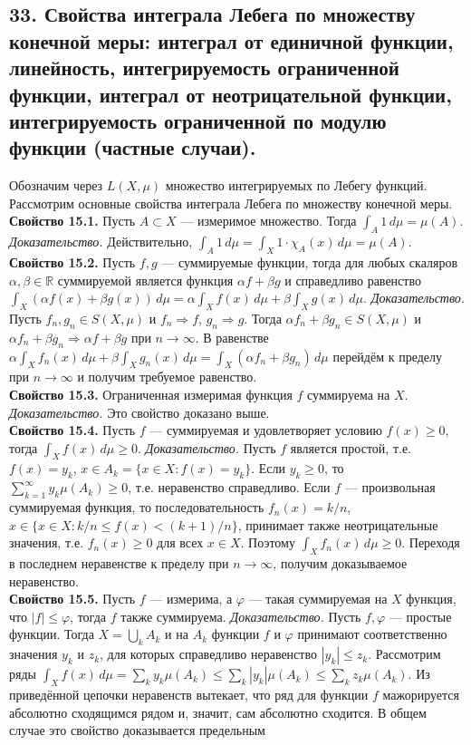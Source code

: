\documentclass[12pt]{article}
\begin{document}
\subsection*{33. Свойства интеграла Лебега по множеству конечной меры: интеграл от единичной
функции, линейность, интегрируемость ограниченной функции, интеграл от
неотрицательной функции, интегрируемость ограниченной по модулю функции
(частные случаи).}
Обозначим через $L(X,\mu)$ множество интегрируемых по Лебегу функций. Рассмотрим основные свойства интеграла Лебега по множеству конечной меры. \\\textbf{Свойство 15.1.} Пусть $A\subset X$ — измеримое множество. Тогда $\int_A 1\,d\mu=\mu(A)$. \textit{Доказательство.} Действительно, $\int_A 1\,d\mu=\int_X 1\cdot\chi_A(x)\,d\mu=\mu(A)$. \\\textbf{Свойство 15.2.} Пусть $f,g$ — суммируемые функции, тогда для любых скаляров $\alpha,\beta\in\mathbb{R}$ суммируемой является функция $\alpha f+\beta g$ и справедливо равенство $\int_X(\alpha f(x)+\beta g(x))\,d\mu=\alpha\int_X f(x)\,d\mu+\beta\int_X g(x)\,d\mu$. \textit{Доказательство.} Пусть $f_n,g_n\in S(X,\mu)$ и $f_n\Rightarrow f$, $g_n\Rightarrow g$. Тогда $\alpha f_n+\beta g_n\in S(X,\mu)$ и $\alpha f_n+\beta g_n\Rightarrow \alpha f+\beta g$ при $n\to\infty$. В равенстве $\alpha\int_X f_n(x)\,d\mu+\beta\int_X g_n(x)\,d\mu=\int_X(\alpha f_n+\beta g_n)\,d\mu$ перейдём к пределу при $n\to\infty$ и получим требуемое равенство. \\\textbf{Свойство 15.3.} Ограниченная измеримая функция $f$ суммируема на $X$. \textit{Доказательство.} Это свойство доказано выше. \\\textbf{Свойство 15.4.} Пусть $f$ — суммируемая и удовлетворяет условию $f(x)\geq 0$, тогда $\int_X f(x)\,d\mu\geq 0$. \textit{Доказательство.} Пусть $f$ является простой, т.е. $f(x)=y_k$, $x\in A_k=\{x\in X:f(x)=y_k\}$. Если $y_k\geq 0$, то $\sum_{k=1}^\infty y_k\mu(A_k)\geq 0$, т.е. неравенство справедливо. Если $f$ — произвольная суммируемая функция, то последовательность $f_n(x)=k/n$, $x\in\{x\in X:k/n\leq f(x)<(k+1)/n\}$, принимает также неотрицательные значения, т.е. $f_n(x)\geq 0$ для всех $x\in X$. Поэтому $\int_X f_n(x)\,d\mu\geq 0$. Переходя в последнем неравенстве к пределу при $n\to\infty$, получим доказываемое неравенство. \\\textbf{Свойство 15.5.} Пусть $f$ — измерима, а $\varphi$ — такая суммируемая на $X$ функция, что $|f|\leq \varphi$, тогда $f$ также суммируема. \textit{Доказательство.} Пусть $f,\varphi$ — простые функции. Тогда $X=\bigcup_k A_k$ и на $A_k$ функции $f$ и $\varphi$ принимают соответственно значения $y_k$ и $z_k$, для которых справедливо неравенство $|y_k|\leq z_k$. Рассмотрим ряды $\int_X f(x)\,d\mu=\sum_k y_k\mu(A_k)\leq\sum_k |y_k|\mu(A_k)\leq\sum_k z_k\mu(A_k)$. Из приведённой цепочки неравенств вытекает, что ряд для функции $f$ мажорируется абсолютно сходящимся рядом и, значит, сам абсолютно сходится. В общем случае это свойство доказывается предельным
\end{document}
